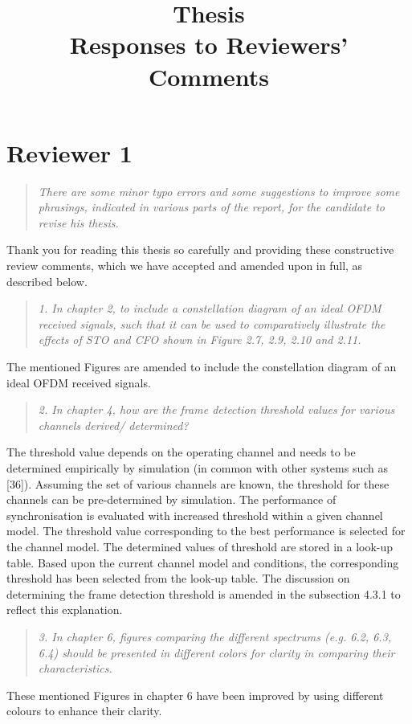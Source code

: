 \documentclass{article}
\title{Thesis\\ Responses to Reviewers' Comments}
\begin{document}
\maketitle

\section*{Reviewer 1}

\begin{quote}
\emph{There are some minor typo errors and some suggestions to improve some phrasings, indicated in various parts of the report, for the candidate to revise his thesis.}
\end{quote}
Thank you for reading this thesis so carefully and providing these constructive review comments, which we have accepted and amended upon in full, as described below. 

\begin{quote}
\emph{1. In chapter 2, to include a constellation diagram of an ideal OFDM received signals, such that it can be used to comparatively illustrate the effects of STO and CFO shown in Figure 2.7, 2.9, 2.10 and 2.11.}
\end{quote} 
The mentioned Figures are amended to include the constellation diagram of an ideal OFDM received signals.

\begin{quote}
\emph{2. In chapter 4, how are the frame detection threshold values for various channels derived/ determined?}
\end{quote}
The threshold value depends on the operating channel and needs to be determined empirically by simulation (in common with other systems such as [36]). Assuming the set of various channels are known, the threshold for these channels can be pre-determined by simulation. The performance of synchronisation is evaluated with increased threshold within a given channel model. The threshold value corresponding to the best performance is selected for the channel model. The determined values of threshold are stored in a look-up table. Based upon the current channel model and conditions, the corresponding threshold has been selected from the look-up table. 
The discussion on determining the frame detection threshold is amended in the subsection 4.3.1 to reflect this explanation.

\begin{quote}
\emph{3. In chapter 6, figures comparing the different spectrums (e.g. 6.2, 6.3, 6.4) should be presented in different colors for clarity in comparing their characteristics.}
\end{quote}
These mentioned Figures in chapter 6 have been improved by using different colours to enhance their clarity.
\end{document}
